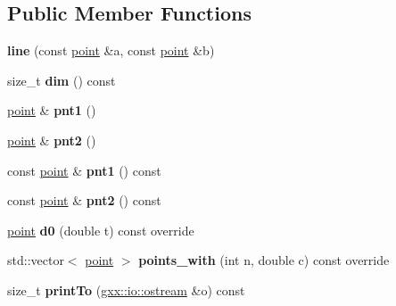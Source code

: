 \subsection*{Public Member Functions}
\begin{DoxyCompactItemize}
\item 
{\bfseries line} (const \hyperlink{classgxx_1_1ngeom_1_1point}{point} \&a, const \hyperlink{classgxx_1_1ngeom_1_1point}{point} \&b)\hypertarget{classgxx_1_1ngeom_1_1line_a7f358cee4659a83476e6dcd47af30e45}{}\label{classgxx_1_1ngeom_1_1line_a7f358cee4659a83476e6dcd47af30e45}

\item 
size\+\_\+t {\bfseries dim} () const \hypertarget{classgxx_1_1ngeom_1_1line_a9ba1029a43a56039e27a5cd10a3c919b}{}\label{classgxx_1_1ngeom_1_1line_a9ba1029a43a56039e27a5cd10a3c919b}

\item 
\hyperlink{classgxx_1_1ngeom_1_1point}{point} \& {\bfseries pnt1} ()\hypertarget{classgxx_1_1ngeom_1_1line_ab5fe9fe6f0c26203063566f0d29a2905}{}\label{classgxx_1_1ngeom_1_1line_ab5fe9fe6f0c26203063566f0d29a2905}

\item 
\hyperlink{classgxx_1_1ngeom_1_1point}{point} \& {\bfseries pnt2} ()\hypertarget{classgxx_1_1ngeom_1_1line_a3c01a01154ef2006df2545d816d314c4}{}\label{classgxx_1_1ngeom_1_1line_a3c01a01154ef2006df2545d816d314c4}

\item 
const \hyperlink{classgxx_1_1ngeom_1_1point}{point} \& {\bfseries pnt1} () const \hypertarget{classgxx_1_1ngeom_1_1line_af17d242cb6692d3c8d73d676c3283173}{}\label{classgxx_1_1ngeom_1_1line_af17d242cb6692d3c8d73d676c3283173}

\item 
const \hyperlink{classgxx_1_1ngeom_1_1point}{point} \& {\bfseries pnt2} () const \hypertarget{classgxx_1_1ngeom_1_1line_a56ad095e591a7cebdc709e8dc7385a4f}{}\label{classgxx_1_1ngeom_1_1line_a56ad095e591a7cebdc709e8dc7385a4f}

\item 
\hyperlink{classgxx_1_1ngeom_1_1point}{point} {\bfseries d0} (double t) const override\hypertarget{classgxx_1_1ngeom_1_1line_a4c2eb3119f581672491e541303fb6b30}{}\label{classgxx_1_1ngeom_1_1line_a4c2eb3119f581672491e541303fb6b30}

\item 
std\+::vector$<$ \hyperlink{classgxx_1_1ngeom_1_1point}{point} $>$ {\bfseries points\+\_\+with} (int n, double c) const override\hypertarget{classgxx_1_1ngeom_1_1line_ac8ae38e407f31dd5b4d8a87352ef3eb7}{}\label{classgxx_1_1ngeom_1_1line_ac8ae38e407f31dd5b4d8a87352ef3eb7}

\item 
size\+\_\+t {\bfseries print\+To} (\hyperlink{classgxx_1_1io_1_1ostream}{gxx\+::io\+::ostream} \&o) const \hypertarget{classgxx_1_1ngeom_1_1line_aecf9453d833510c832a127c27575ca57}{}\label{classgxx_1_1ngeom_1_1line_aecf9453d833510c832a127c27575ca57}

\end{DoxyCompactItemize}
